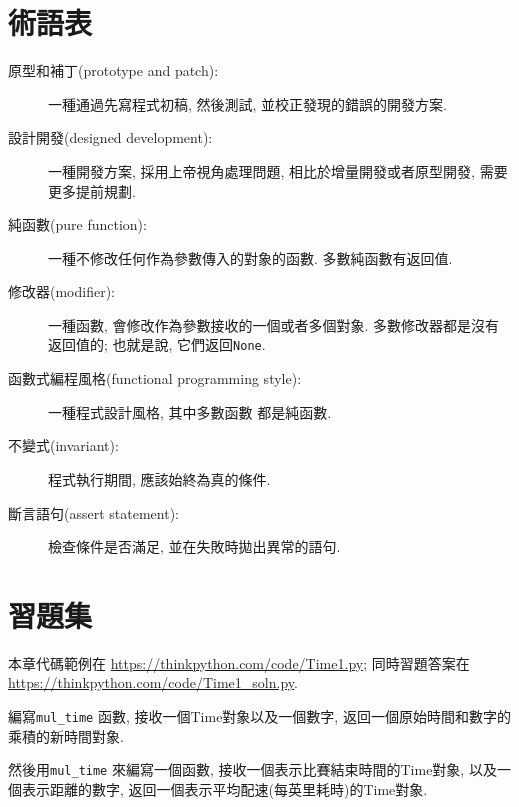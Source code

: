 \documentclass[10pt]{book}
\begin{document}
\section{術語表}

\begin{description}

\item[原型和補丁(prototype and patch):] 一種通過先寫程式初稿, 然後測試, 並校正發現的錯誤的開發方案. 

\item[設計開發(designed development):] 一種開發方案, 採用上帝視角處理問題, 
相比於增量開發或者原型開發, 需要更多提前規劃. 

\item[純函數(pure function):] 一種不修改任何作為參數傳入的對象的函數. 
多數純函數有返回值. 

\item[修改器(modifier):] 一種函數, 
會修改作為參數接收的一個或者多個對象. 
多數修改器都是沒有返回值的;
也就是說, 它們返回{\tt None}. 

\item[函數式編程風格(functional programming style):] 一種程式設計風格, 其中多數函數
都是純函數.

\item[不變式(invariant):] 程式執行期間, 應該始終為真的條件. 

\item[斷言語句(assert statement):] 檢查條件是否滿足, 並在失敗時拋出異常的語句. 

\end{description}


\section{習題集}

本章代碼範例在
\url{https://thinkpython.com/code/Time1.py}; 
同時習題答案在\url{https://thinkpython.com/code/Time1_soln.py}.

\begin{exercise}

編寫\verb"mul_time" 函數, 接收一個Time對象以及一個數字, 
返回一個原始時間和數字的乘積的新時間對象. 

然後用\verb"mul_time" 來編寫一個函數, 接收一個表示比賽結束時間的Time對象, 
以及一個表示距離的數字, 返回一個表示平均配速(每英里耗時)的Time對象. 

\end{exercise}
\end{document}
